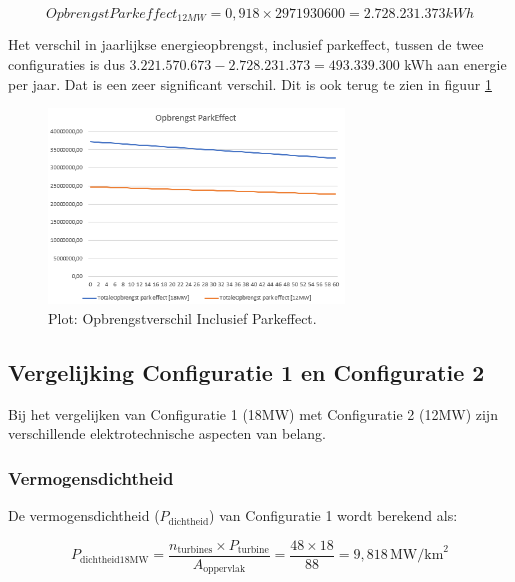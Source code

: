 \begin{equation} \label{eq:17}
OpbrengstParkeffect_{12MW}= 0,918\times 2971930600 = 2.728.231.373 kWh
\end{equation}

Het verschil in jaarlijkse energieopbrengst, inclusief parkeffect, tussen de twee configuraties is dus \(3.221.570.673 - 2.728.231.373 = 493.339.300\) kWh aan energie per jaar. Dat is een zeer significant verschil. Dit is ook terug te zien in figuur \ref{fig:OpbrengstPark}

\begin{figure}[H]
\centering
\includegraphics[width=0.7\textwidth]{IMG/data/overzicht/opbrengstverschil_inclusief_parkeffect.PNG}
\caption{Plot: Opbrengstverschil Inclusief Parkeffect.}
\label{fig:OpbrengstPark}
\end{figure}

\subsection{Vergelijking Configuratie 1 en Configuratie 2}

Bij het vergelijken van Configuratie 1 (18MW) met Configuratie 2 (12MW) zijn verschillende elektrotechnische aspecten van belang. 

\subsubsection{Vermogensdichtheid}

De vermogensdichtheid (\(P_{\text{dichtheid}}\)) van Configuratie 1 wordt berekend als:

\begin{equation} \label{eq:18}
P_{\text{dichtheid18MW}} = \frac{{n_{\text{turbines}} \times P_{\text{turbine}}}}{{A_{\text{oppervlak}}}} = \frac{{48 \times 18}}{{88}} = 9,818 \, \text{MW/km}^2
\end{equation}

